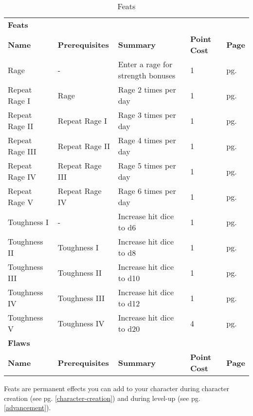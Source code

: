 \begin{multicols*}{2}
    \begin{table*}[ht]
        \unclassedrowcolors
        \begin{tabularx}{\textwidth}{l X X l l}
            \multicolumn{5}{l}{\textbf{Feats}} \\
            \textbf{Name} & \textbf{Prerequisites} & \textbf{Summary} & \textbf{Point Cost} & \textbf{Page} \\
            Rage & - & Enter a rage for strength bonuses & 1 & pg. \pageref{feat:rage} \\
            \quad Repeat Rage I & Rage & Rage 2 times per day & 1 & pg. \pageref{feat:repeatrage1} \\
            \quad Repeat Rage II & Repeat Rage I & Rage 3 times per day & 1 & pg. \pageref{feat:repeatrage2} \\
            \quad Repeat Rage III & Repeat Rage II & Rage 4 times per day & 1 & pg. \pageref{feat:repeatrage3} \\
            \quad Repeat Rage IV & Repeat Rage III & Rage 5 times per day & 1 & pg. \pageref{feat:repeatrage4} \\
            \quad Repeat Rage V & Repeat Rage IV & Rage 6 times per day & 1 & pg. \pageref{feat:repeatrage5} \\
            Toughness I & - & Increase hit dice to d6 & 1 & pg. \pageref{feat:toughness1} \\
            \quad Toughness II & Toughness I & Increase hit dice to d8 & 1 & pg. \pageref{feat:toughness2} \\
            \quad Toughness III & Toughness II & Increase hit dice to d10 & 1 & pg. \pageref{feat:toughness3} \\
            \quad Toughness IV & Toughness III & Increase hit dice to d12 & 1 & pg. \pageref{feat:toughness4} \\
            \quad Toughness V & Toughness IV & Increase hit dice to d20 & 4 & pg. \pageref{feat:toughness5} \\
            \multicolumn{5}{l}{\textbf{Flaws}} \\
            \textbf{Name} & \textbf{Prerequisites} & \textbf{Summary} & \textbf{Point Cost} & \textbf{Page} \\
        \end{tabularx}
        \caption{Feats}
        \label{tab:feats}
    \end{table*}

    Feats are permanent effects you can add to your character during character
    creation (see pg. \ref{character-creation}) and during level-up (see pg.
    \ref{advancement}).


\end{multicols*}
